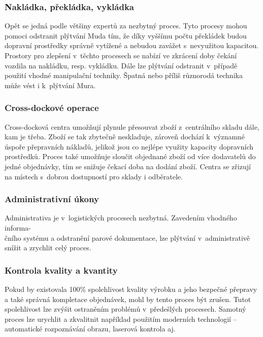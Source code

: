 \subsubsection*{Nakládka, překládka, vykládka}

Opět se jedná podle většiny expertů za nezbytný proces. Tyto procesy mohou pomoci odstranit plýtvání Muda tím, že díky vyššímu počtu překládek budou dopravní prostředky správně vytížené a nebudou zavážet s~nevyužitou kapacitou. Prostory pro zlepšení v~těchto procesech se nabízí ve zkrácení doby čekání vozdila na nakládku, resp. vykládku. Dále lze plýtvání odstranit v~případě použití vhodné manipulační techniky. Špatná nebo příliš různorodá technika může vést i k~plýtvání Mura.

\subsubsection*{Cross-dockové operace}

Cross-docková centra umožňují plynule přesouvat zboží z~centrálního skladu dále, kam je třeba. Zboží se tak zbytečně neskladuje, zároveň dochází k~významné úspoře přepravních nákladů, jelikož jsou co nejlépe využity kapacity dopravních prostředků. Proces také umožňuje sloučit objednané zboží od více dodavatelů do jedné objednávky, tím se snižuje čekací doba na dodání zboží. Centra se zřizují na místech s~dobrou dostupností pro sklady i odběratele.

\subsubsection*{Administrativní úkony}

Administrativa je v~logistických procesech nezbytná. Zavedením vhodného informa-\\čního systému a odstranění parové dokumentace, lze plýtvání v~administrativě snížit a zrychlit celý proces. 

\subsubsection*{Kontrola kvality a kvantity}

Pokud by existovala 100\% spolehlivost kvality výrobku a jeho bezpečné přepravy a také správná kompletace objednávek, mohl by tento proces být zrušen. Tutot spolehlivost lze zvýšit ostraněním problémů v~předešlých procesech. Samotný proces lze urychlit a zkvalitnit například použitím moderních technologií -- automatické rozpoznávání obrazu, laserová kontrola aj.

